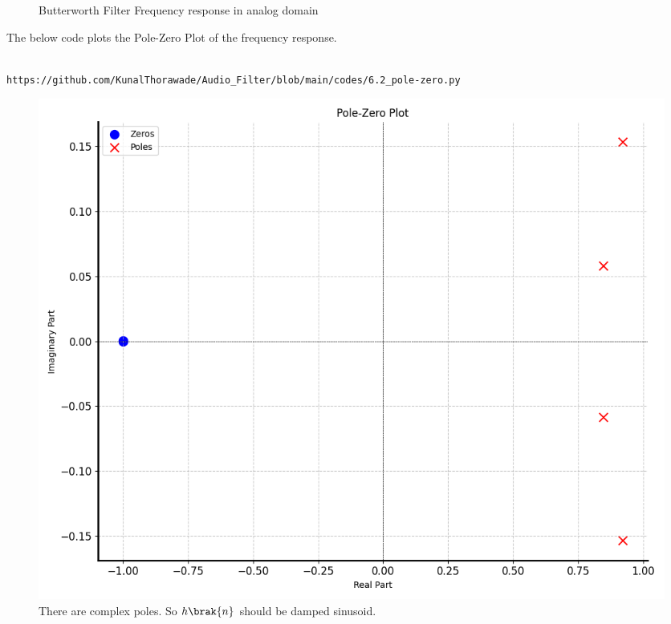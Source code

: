\documentclass[journal,12pt,twocolumn]{IEEEtran}
\theoremstyle{remark}
\begin{document}
\begin{enumerate}[label=\thesection.\arabic*]
\begin{figure}[H]
																																																																																													    \caption{Butterworth Filter Frequency response in analog domain}
																																																																																													    \label{fig:H(w)_6}
																																																																																													    \end{figure}



																																																																																													    The below code plots the Pole-Zero Plot of the frequency response.
																																																																																													    \begin{lstlisting}
																																																																																													    https://github.com/KunalThorawade/Audio_Filter/blob/main/codes/6.2_pole-zero.py
																																																																																													    \end{lstlisting}
																																																																																													    \begin{figure}[H]
																																																																																													    \centering
																																																																																													    \includegraphics[width=1\columnwidth]{figs/Pole_Zero_Plt.png}
																																																																																													    \caption{There are complex poles. So $h\brak{n}$ should be damped sinusoid.}
																																																																																													    \label{fig:pole_zero_6.2}
																																																																																													    \end{figure}


\end{enumerate}
\end{document}
